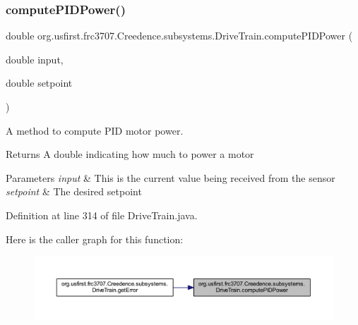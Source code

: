 \subsubsection{\texorpdfstring{computePIDPower()}{computePIDPower()}}
{\footnotesize\ttfamily double org.\+usfirst.\+frc3707.\+Creedence.\+subsystems.\+Drive\+Train.\+compute\+P\+I\+D\+Power (\begin{DoxyParamCaption}\item[{double}]{input,  }\item[{double}]{setpoint }\end{DoxyParamCaption})}

A method to compute P\+ID motor power.

\begin{DoxyReturn}{Returns}
A double indicating how much to power a motor 
\end{DoxyReturn}

\begin{DoxyParams}{Parameters}
{\em input} & This is the current value being received from the sensor \\
\hline
{\em setpoint} & The desired setpoint \\
\hline
\end{DoxyParams}


Definition at line 314 of file Drive\+Train.\+java.

Here is the caller graph for this function\+:
\nopagebreak
\begin{figure}[H]
\begin{center}
\leavevmode
\includegraphics[width=350pt]{classorg_1_1usfirst_1_1frc3707_1_1_creedence_1_1subsystems_1_1_drive_train_afb1ac8b5266985f7fb0232198da4d006_icgraph}
\end{center}
\end{figure}
\mbox{\label{classorg_1_1usfirst_1_1frc3707_1_1_creedence_1_1subsystems_1_1_drive_train_a492a2baf7f63ea3db90dd2608220c0af}} 
